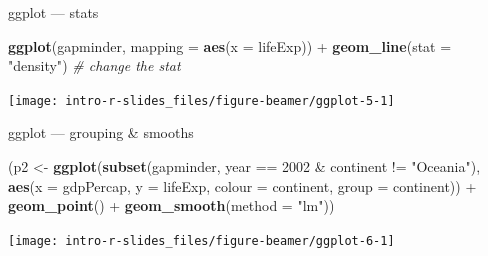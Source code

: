 \documentclass[10pt,ignorenonframetext,compress, aspectratio=169]{beamer}
\newenvironment{Shaded}{\begin{snugshade}}{\end{snugshade}}
\newcommand{\KeywordTok}[1]{\textcolor[rgb]{0.13,0.29,0.53}{\textbf{{#1}}}}
\newcommand{\DataTypeTok}[1]{\textcolor[rgb]{0.13,0.29,0.53}{{#1}}}
\newcommand{\DecValTok}[1]{\textcolor[rgb]{0.00,0.00,0.81}{{#1}}}
\newcommand{\StringTok}[1]{\textcolor[rgb]{0.31,0.60,0.02}{{#1}}}
\newcommand{\CommentTok}[1]{\textcolor[rgb]{0.56,0.35,0.01}{\textit{{#1}}}}
\newcommand{\NormalTok}[1]{{#1}}
\begin{document}
\begin{frame}[fragile]{ggplot --- stats}

\scriptsize

\begin{Shaded}
\begin{Highlighting}[]
\KeywordTok{ggplot}\NormalTok{(gapminder, }\DataTypeTok{mapping =} \KeywordTok{aes}\NormalTok{(}\DataTypeTok{x =} \NormalTok{lifeExp)) +}
\StringTok{    }\KeywordTok{geom_line}\NormalTok{(}\DataTypeTok{stat =} \StringTok{"density"}\NormalTok{)         }\CommentTok{# change the stat}
\end{Highlighting}
\end{Shaded}

\begin{center}\texttt{[image: intro-r-slides\_files/figure-beamer/ggplot-5-1]} \end{center}

\normalsize

\end{frame}

\begin{frame}[fragile]{ggplot --- grouping \& smooths}

\scriptsize

\begin{Shaded}
\begin{Highlighting}[]
\NormalTok{(p2 <-}\StringTok{ }\KeywordTok{ggplot}\NormalTok{(}\KeywordTok{subset}\NormalTok{(gapminder, year ==}\StringTok{ }\DecValTok{2002} \NormalTok{&}\StringTok{ }\NormalTok{continent !=}\StringTok{ "Oceania"}\NormalTok{),}
             \KeywordTok{aes}\NormalTok{(}\DataTypeTok{x =} \NormalTok{gdpPercap, }\DataTypeTok{y =} \NormalTok{lifeExp, }\DataTypeTok{colour =} \NormalTok{continent, }\DataTypeTok{group =} \NormalTok{continent)) +}
\StringTok{        }\KeywordTok{geom_point}\NormalTok{() +}\StringTok{ }\KeywordTok{geom_smooth}\NormalTok{(}\DataTypeTok{method =} \StringTok{"lm"}\NormalTok{))}
\end{Highlighting}
\end{Shaded}

\begin{center}\texttt{[image: intro-r-slides\_files/figure-beamer/ggplot-6-1]} \end{center}

\normalsize

\end{frame}
\end{document}
